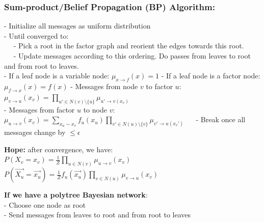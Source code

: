 \subsubsection{Sum-product/Belief Propagation (BP) Algorithm:}
- Initialize all messages as uniform distribution\\
- Until converged to:\\
$\quad$ - Pick a root in the factor graph and reorient the edges towards this root.\\
$\quad$ -  Update messages according to this ordering. Do passes from leaves to root and from root to leaves.\\
- If a leaf node is a variable node: 
$\mu_{x\rightarrow f}(x)=1$
- If a leaf node is a factor node:
$\mu_{f \rightarrow x}(x)=f(x)$
- Messages from node $v$ to factor $u$:\\
    $\mu_{v\rightarrow u}(x_v) = \prod_{u'\in N(v)\setminus \{u\}}\mu_{u'\rightarrow v(x_v)}$\\
- Messages from factor $u$ to node $v$:\\
    $\mu_{u\rightarrow v}(x_v) = \sum_{x_u\sim x_v}f_u(x_u) \prod_{v'\in N(u)\setminus \{v\}}\mu_{v'\rightarrow u(x_v')}$
$\quad$ -  Break once all messages change by $\leq \epsilon$

\textbf{Hope:} after convergence, we have:\\
$P(X_v=x_v)=\frac{1}{Z}\prod_{u \in N(v)}\mu_{u\rightarrow v}(x_v)$\\
$P(\overrightarrow{X_u}=\overrightarrow{x_u})=\frac{1}{Z} f_u(\overrightarrow{x_u})\prod_{v\in N(u)}\mu_{v\rightarrow u}(x_v)$

\textbf{If we have a polytree Bayesian network}:\\
- Choose one node as root\\
- Send messages from leaves to root and from root to leaves\\
